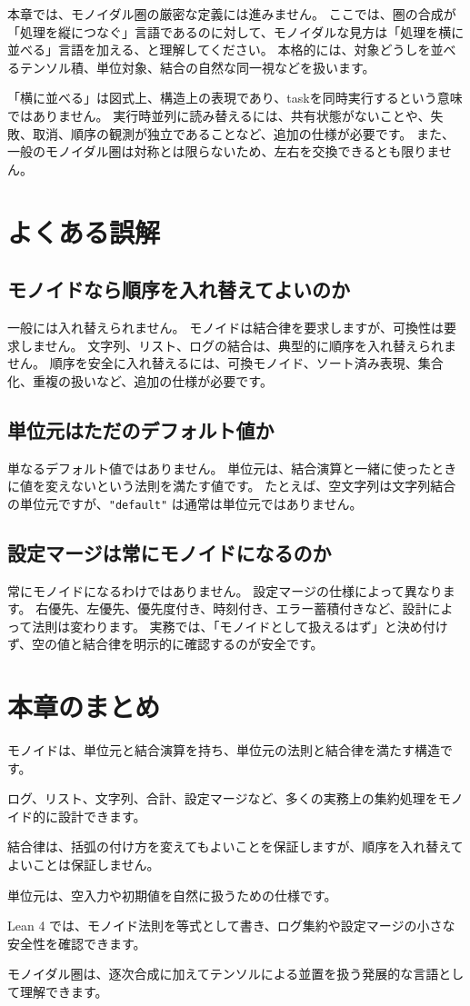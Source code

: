
本章では、モノイダル圏の厳密な定義には進みません。
ここでは、圏の合成が「処理を縦につなぐ」言語であるのに対して、モノイダルな見方は「処理を横に並べる」言語を加える、と理解してください。
本格的には、対象どうしを並べるテンソル積、単位対象、結合の自然な同一視などを扱います。

「横に並べる」は図式上、構造上の表現であり、taskを同時実行するという意味ではありません。
実行時並列に読み替えるには、共有状態がないことや、失敗、取消、順序の観測が独立であることなど、追加の仕様が必要です。
また、一般のモノイダル圏は対称とは限らないため、左右を交換できるとも限りません。

\section{よくある誤解}

\subsection{モノイドなら順序を入れ替えてよいのか}

一般には入れ替えられません。
モノイドは結合律を要求しますが、可換性は要求しません。
文字列、リスト、ログの結合は、典型的に順序を入れ替えられません。
順序を安全に入れ替えるには、可換モノイド、ソート済み表現、集合化、重複の扱いなど、追加の仕様が必要です。

\subsection{単位元はただのデフォルト値か}

単なるデフォルト値ではありません。
単位元は、結合演算と一緒に使ったときに値を変えないという法則を満たす値です。
たとえば、空文字列は文字列結合の単位元ですが、\texttt{"default"} は通常は単位元ではありません。

\subsection{設定マージは常にモノイドになるのか}

常にモノイドになるわけではありません。
設定マージの仕様によって異なります。
右優先、左優先、優先度付き、時刻付き、エラー蓄積付きなど、設計によって法則は変わります。
実務では、「モノイドとして扱えるはず」と決め付けず、空の値と結合律を明示的に確認するのが安全です。

\section{本章のまとめ}

モノイドは、単位元と結合演算を持ち、単位元の法則と結合律を満たす構造です。

ログ、リスト、文字列、合計、設定マージなど、多くの実務上の集約処理をモノイド的に設計できます。

結合律は、括弧の付け方を変えてもよいことを保証しますが、順序を入れ替えてよいことは保証しません。

単位元は、空入力や初期値を自然に扱うための仕様です。

Lean 4 では、モノイド法則を等式として書き、ログ集約や設定マージの小さな安全性を確認できます。

モノイダル圏は、逐次合成に加えてテンソルによる並置を扱う発展的な言語として理解できます。
